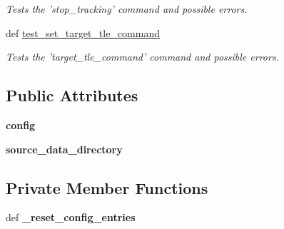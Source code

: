 \begin{DoxyCompactItemize}
\begin{DoxyCompactList}\small\item\em Tests the 'stop\-\_\-tracking' command and possible errors. \end{DoxyCompactList}\item 
\hypertarget{classhwm_1_1hardware_1_1devices_1_1drivers_1_1sgp4__tracker_1_1tests_1_1test__sgp4__tracker_1_1_test_s_g_p4_handler_a680baa6884590494c4e7ae1c02526380}{def \hyperlink{classhwm_1_1hardware_1_1devices_1_1drivers_1_1sgp4__tracker_1_1tests_1_1test__sgp4__tracker_1_1_test_s_g_p4_handler_a680baa6884590494c4e7ae1c02526380}{test\-\_\-set\-\_\-target\-\_\-tle\-\_\-command}}\label{classhwm_1_1hardware_1_1devices_1_1drivers_1_1sgp4__tracker_1_1tests_1_1test__sgp4__tracker_1_1_test_s_g_p4_handler_a680baa6884590494c4e7ae1c02526380}

\begin{DoxyCompactList}\small\item\em Tests the 'target\-\_\-tle\-\_\-command' command and possible errors. \end{DoxyCompactList}\end{DoxyCompactItemize}
\subsection*{Public Attributes}
\begin{DoxyCompactItemize}
\item 
\hypertarget{classhwm_1_1hardware_1_1devices_1_1drivers_1_1sgp4__tracker_1_1tests_1_1test__sgp4__tracker_1_1_test_s_g_p4_handler_aeb93c14d74a35294db4d3c3d13fbfcce}{{\bfseries config}}\label{classhwm_1_1hardware_1_1devices_1_1drivers_1_1sgp4__tracker_1_1tests_1_1test__sgp4__tracker_1_1_test_s_g_p4_handler_aeb93c14d74a35294db4d3c3d13fbfcce}

\item 
\hypertarget{classhwm_1_1hardware_1_1devices_1_1drivers_1_1sgp4__tracker_1_1tests_1_1test__sgp4__tracker_1_1_test_s_g_p4_handler_a9d20c427ce11d3c79186a80f2e286f45}{{\bfseries source\-\_\-data\-\_\-directory}}\label{classhwm_1_1hardware_1_1devices_1_1drivers_1_1sgp4__tracker_1_1tests_1_1test__sgp4__tracker_1_1_test_s_g_p4_handler_a9d20c427ce11d3c79186a80f2e286f45}

\end{DoxyCompactItemize}
\subsection*{Private Member Functions}
\begin{DoxyCompactItemize}
\item 
\hypertarget{classhwm_1_1hardware_1_1devices_1_1drivers_1_1sgp4__tracker_1_1tests_1_1test__sgp4__tracker_1_1_test_s_g_p4_handler_ac9a3d98f42c53fa5a6f7829da6d60a05}{def {\bfseries \-\_\-reset\-\_\-config\-\_\-entries}}\label{classhwm_1_1hardware_1_1devices_1_1drivers_1_1sgp4__tracker_1_1tests_1_1test__sgp4__tracker_1_1_test_s_g_p4_handler_ac9a3d98f42c53fa5a6f7829da6d60a05}

\end{DoxyCompactItemize}


